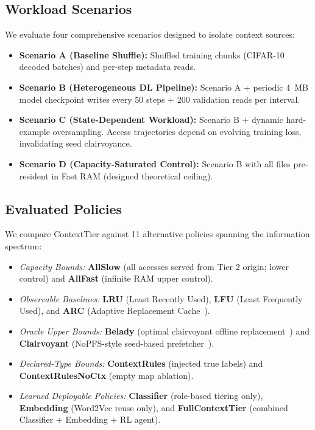 \documentclass[conference]{IEEEtran}
\begin{document}
\subsection{Workload Scenarios}
We evaluate four comprehensive scenarios designed to isolate context sources:
\begin{itemize}
    \item \textbf{Scenario A (Baseline Shuffle):} Shuffled training chunks (CIFAR-10 decoded batches) and per-step metadata reads.
    \item \textbf{Scenario B (Heterogeneous DL Pipeline):} Scenario A + periodic 4~MB model checkpoint writes every 50 steps + 200 validation reads per interval.
    \item \textbf{Scenario C (State-Dependent Workload):} Scenario B + dynamic hard-example oversampling. Access trajectories depend on evolving training loss, invalidating seed clairvoyance.
    \item \textbf{Scenario D (Capacity-Saturated Control):} Scenario B with all files pre-resident in Fast RAM (designed theoretical ceiling).
\end{itemize}

\subsection{Evaluated Policies}
We compare ContextTier against 11 alternative policies spanning the information spectrum:
\begin{itemize}
    \item \textit{Capacity Bounds:} \textbf{AllSlow} (all accesses served from Tier 2 origin; lower control) and \textbf{AllFast} (infinite RAM upper control).
    \item \textit{Observable Baselines:} \textbf{LRU} (Least Recently Used), \textbf{LFU} (Least Frequently Used), and \textbf{ARC} (Adaptive Replacement Cache~\cite{megiddo2003arc}).
    \item \textit{Oracle Upper Bounds:} \textbf{Belady} (optimal clairvoyant offline replacement~\cite{belady1966study}) and \textbf{Clairvoyant} (NoPFS-style seed-based prefetcher~\cite{dryden2021clairvoyant}).
    \item \textit{Declared-Type Bounds:} \textbf{ContextRules} (injected true labels) and \textbf{ContextRulesNoCtx} (empty map ablation).
    \item \textit{Learned Deployable Policies:} \textbf{Classifier} (role-based tiering only), \textbf{Embedding} (Word2Vec reuse only), and \textbf{FullContextTier} (combined Classifier + Embedding + RL agent).
\end{itemize}
\end{document}
